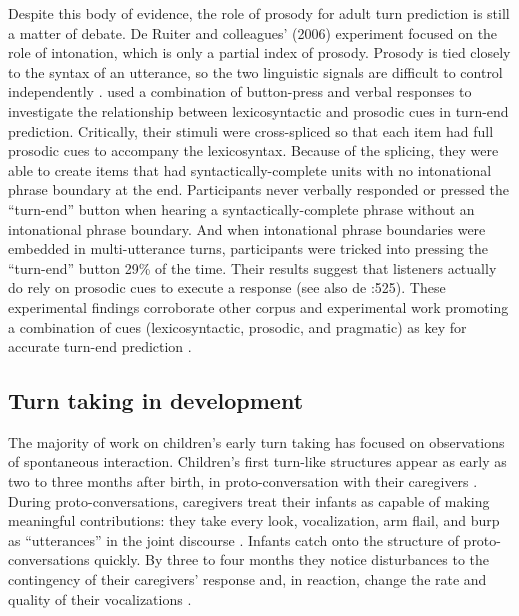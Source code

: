 \documentclass[authoryear, 12pt]{elsarticle}
\begin{document}
Despite this body of evidence, the role of prosody for adult turn prediction is still a matter of debate. De Ruiter and colleagues' (2006) experiment focused on the role of intonation, which is only a partial index of prosody. Prosody is tied closely to the syntax of an utterance, so the two linguistic signals are difficult to control independently \citep{ford1996}. \citet*{torreira2015} used a combination of button-press and verbal responses to investigate the relationship between lexicosyntactic and prosodic cues in turn-end prediction. Critically, their stimuli were cross-spliced so that each item had full prosodic cues to accompany the lexicosyntax. Because of the splicing, they were able to create items that had syntactically-complete units with no intonational phrase boundary at the end. Participants never verbally responded or pressed the ``turn-end'' button when hearing a syntactically-complete phrase without an intonational phrase boundary. And when intonational phrase boundaries were embedded in multi-utterance turns, participants were tricked into pressing the ``turn-end'' button 29\% of the time. Their results suggest that listeners actually do rely on prosodic cues to execute a response (see also de \citet{de-ruiter2006}:525). These experimental findings corroborate other corpus and experimental work promoting a combination of cues (lexicosyntactic, prosodic, and pragmatic) as key for accurate turn-end prediction \citep{duncan1972, ford1996, hirvenkari2013}. 

\subsection{Turn taking in development}


The majority of work on children's early turn taking has focused on observations of spontaneous interaction. Children's first turn-like structures appear as early as two to three months after birth, in proto-conversation with their caregivers \citep{bruner1975, bruner1985}. During proto-conversations, caregivers treat their infants as capable of making meaningful contributions: they take every look, vocalization, arm flail, and burp as ``utterances'' in the joint discourse \citep{bateson1975, jaffe2001, snow1977}. Infants catch onto the structure of proto-conversations quickly. By three to four months they notice disturbances to the contingency of their caregivers' response and, in reaction, change the rate and quality of their vocalizations \citep{k-bloom1988, masataka1993, toda1993}. 
\end{document}

